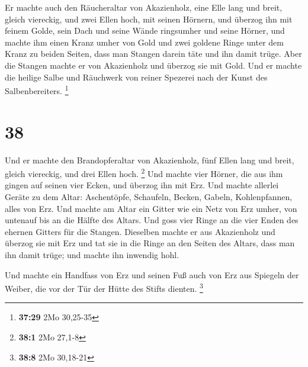  Er machte auch den Räucheraltar von Akazienholz, eine Elle
lang und breit, gleich viereckig, und zwei Ellen hoch, mit seinen
Hörnern,  und überzog ihn mit feinem Golde, sein Dach und
seine Wände ringsumher und seine Hörner, und machte ihm einen Kranz
umher von Gold  und zwei goldene Ringe unter dem Kranz zu
beiden Seiten, dass man Stangen darein täte und ihn damit trüge.
 Aber die Stangen machte er von Akazienholz und überzog sie
mit Gold.  Und er machte die heilige Salbe und Räuchwerk
von reiner Spezerei nach der Kunst des Salbenbereiters. \footnote{\textbf{37:29}
  2Mo 30,25-35}

\hypertarget{section-9}{%
\section{38}\label{section-9}}

 Und er machte den Brandopferaltar von Akazienholz, fünf
Ellen lang und breit, gleich viereckig, und drei Ellen hoch. \footnote{\textbf{38:1}
  2Mo 27,1-8}  Und machte vier Hörner, die aus ihm gingen
auf seinen vier Ecken, und überzog ihn mit Erz.  Und machte
allerlei Geräte zu dem Altar: Aschentöpfe, Schaufeln, Becken, Gabeln,
Kohlenpfannen, alles von Erz.  Und machte am Altar ein
Gitter wie ein Netz von Erz umher, von untenauf bis an die Hälfte des
Altars.  Und goss vier Ringe an die vier Enden des ehernen
Gitters für die Stangen.  Dieselben machte er aus
Akazienholz und überzog sie mit Erz  und tat sie in die
Ringe an den Seiten des Altars, dass man ihn damit trüge; und machte ihn
inwendig hohl.

 Und machte ein Handfass von Erz und seinen Fuß auch von Erz
aus Spiegeln der Weiber, die vor der Tür der Hütte des Stifts dienten.
\footnote{\textbf{38:8} 2Mo 30,18-21}

